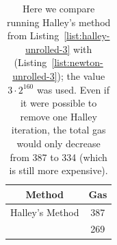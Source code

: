 \begin{table}[pt]
\centering
\begin{tabular}{|c|S[table-format=3.0]|}
\hline
Method & Gas \\
\hline
Halley's Method  & 387 \\
\UnrolledThree{} & 269 \\
\hline
\end{tabular}
\caption[Halley's Method Gas Costs]{Here we
    compare running Halley's method from
    Listing~\ref{list:halley-unrolled-3}
    with \UnrolledThree{} (Listing~\ref{list:newton-unrolled-3});
    the value $3\cdot2^{160}$ was used.
    Even if it were possible to remove one Halley iteration,
    the total gas would only decrease from 387 to 334
    (which is still more expensive).
    }
\label{table:halleys_method_results}
\end{table}
